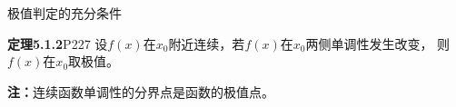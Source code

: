 \begin{frame}{极值判定的充分条件}
	\linespread{1.2}\pause 
	\begin{block}{{\bf 定理5.1.2}\hfill P227}
		设$f(x)$在$x_0$附近连续，若$f(x)$在$x_0$两侧单调性发生改变，
		则$f(x)$在$x_0$取极值。
	\end{block}\pause 
	{\bf 注：}连续函数单调性的分界点是函数的极值点。\pause 
	\begin{center}
	\end{center}
\end{frame}

